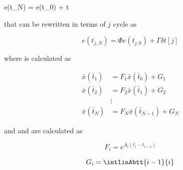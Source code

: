 \noindent
{}
{
    e(t_N) = \Phi e(t_0) + \Gamma \delta t
}

\noindent
that can be rewritten in terms of $j$ cycle as

\noindent
\begin{equation}
    \label{eq:cap4:linearization-error-result-j}
    e(t_{j,N}) = \Phi e(t_{j,0}) + \Gamma \delta t[j]
\end{equation}

\noindent 
where  is calculated as

\noindent
\begin{align}
    \bar{x}(\bar{t}_1) &= F_1 \bar{x}(\bar{t}_0) + G_1 \\
    \bar{x}(\bar{t}_2) &= F_2 \bar{x}(\bar{t}_1) + G_2 \\
    &\vdots \nonumber \\
    \bar{x}(\bar{t}_N) &= F_{N} \bar{x}(\bar{t}_{N-1}) + G_{N}
\end{align}

\noindent
and  and  are calculated as

\noindent
\begin{equation}
    F_i = e^{A_i(t_i - t_{i-1})}
\end{equation}

\noindent
\begin{equation}
    G_i = \intlinAbtt{i-1}{i}
\end{equation}
